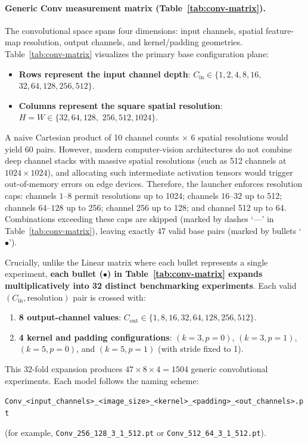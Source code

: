 \paragraph{Generic Conv measurement matrix (Table~\ref{tab:conv-matrix}).}
The convolutional space spans four dimensions: input channels, spatial feature-map resolution, output channels, and kernel/padding geometries. Table~\ref{tab:conv-matrix} visualizes the primary base configuration plane:
\begin{itemize}
    \item \textbf{Rows represent the input channel depth}: $C_{\text{in}} \in \{1, 2, 4, 8, 16,$ $32, 64, 128, 256, 512\}$.
    \item \textbf{Columns represent the square spatial resolution}: $H = W \in \{32, 64, 128,$ $256, 512, 1024\}$.
\end{itemize}

A naive Cartesian product of 10 channel counts $\times$ 6 spatial resolutions would yield 60 pairs. However, modern computer-vision architectures do not combine deep channel stacks with massive spatial resolutions (such as 512 channels at $1024 \times 1024$), and allocating such intermediate activation tensors would trigger out-of-memory errors on edge devices. Therefore, the launcher enforces resolution caps: channels $1$--$8$ permit resolutions up to 1024; channels $16$--$32$ up to 512; channels $64$--$128$ up to 256; channel 256 up to 128; and channel 512 up to 64. Combinations exceeding these caps are skipped (marked by dashes `---' in Table~\ref{tab:conv-matrix}), leaving exactly 47 valid base pairs (marked by bullets `$\bullet$').

Crucially, unlike the Linear matrix where each bullet represents a single experiment, \textbf{each bullet ($\bullet$) in Table~\ref{tab:conv-matrix} expands multiplicatively into 32 distinct benchmarking experiments}. Each valid $(C_{\text{in}}, \text{resolution})$ pair is crossed with:
\begin{enumerate}
    \item \textbf{8 output-channel values}: $C_{\text{out}} \in \{1, 8, 16, 32, 64, 128, 256, 512\}$.
    \item \textbf{4 kernel and padding configurations}: $(k=3, p=0)$, $(k=3, p=1)$, $(k=5, p=0)$, and $(k=5, p=1)$ (with stride fixed to 1).
\end{enumerate}
This 32-fold expansion produces $47 \times 8 \times 4 = 1504$ generic convolutional experiments. Each model follows the naming scheme:
\begin{center}
\footnotesize
\texttt{Conv\_<input\_channels>\_<image\_size>\_<kernel>\_<padding>\_<out\_channels>.pt}
\end{center}
(for example, \texttt{Conv\_256\_128\_3\_1\_512.pt} or \texttt{Conv\_512\_64\_3\_1\_512.pt}).

